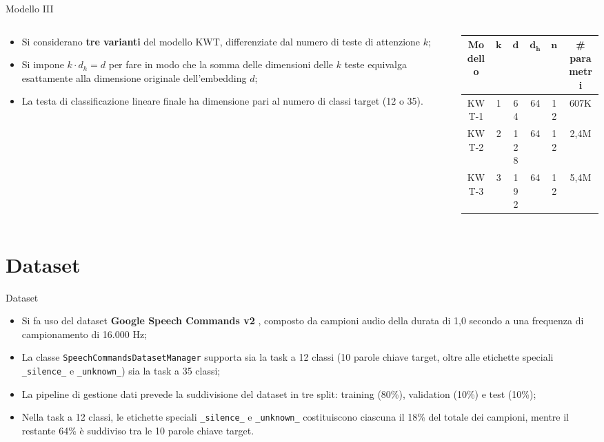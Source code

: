 \documentclass[aspectratio=169]{beamer}
\begin{document}
\begin{frame}{Modello III}
  \begin{columns}[c]
    \begin{column}{0.4\textwidth}
      \begin{itemize}
        \item Si considerano \textbf{tre varianti} del modello KWT, differenziate dal numero di teste di attenzione $k$;
        \item Si impone $k \cdot d_h = d$ per fare in modo che la somma delle dimensioni delle $k$ teste equivalga esattamente alla dimensione originale dell'embedding $d$;
        \item La testa di classificazione lineare finale ha dimensione pari al numero di classi target (12 o 35).
      \end{itemize}
    \end{column}
    \begin{column}{0.6\textwidth}
      \centering
      \begin{tabular}{cccccc}
        \toprule
        \textbf{Modello} & $\mathbf{k}$ & $\mathbf{d}$ & $\mathbf{d_h}$ & $\mathbf{n}$ & \textbf{\# parametri} \\
        \midrule
        KWT-1 & 1 & 64 & 64 & 12 & 607K \\
        KWT-2 & 2 & 128 & 64 & 12 & 2,4M \\
        KWT-3 & 3 & 192 & 64 & 12 & 5,4M \\
        \bottomrule
      \end{tabular}
    \end{column}
  \end{columns}
\end{frame}

\section{Dataset}

\begin{frame}{Dataset} 
  \begin{itemize}
    \item Si fa uso del dataset \textbf{Google Speech Commands v2} \cite{warden2018speechcommandsdatasetlimitedvocabulary}, composto da campioni audio della durata di 1,0 secondo a una frequenza di campionamento di 16.000 Hz;
    \item La classe \texttt{SpeechCommandsDatasetManager} supporta sia la task a 12 classi (10 parole chiave target, oltre alle etichette speciali \texttt{\_silence\_} e \texttt{\_unknown\_}) sia la task a 35 classi;
    \item La pipeline di gestione dati prevede la suddivisione del dataset in tre split: training (80\%), validation (10\%) e test (10\%);
    \item Nella task a 12 classi, le etichette speciali \texttt{\_silence\_} e \texttt{\_unknown\_} costituiscono ciascuna il 18\% del totale dei campioni, mentre il restante 64\% è suddiviso tra le 10 parole chiave target.
  \end{itemize}
\end{frame}
\end{document}
